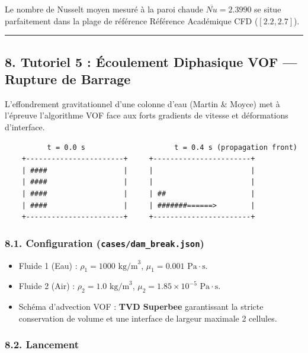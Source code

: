 \documentclass[
  french,
]{article}
\providecommand{\tightlist}{%
  \setlength{\itemsep}{0pt}\setlength{\parskip}{0pt}}
\begin{document}
Le nombre de Nusselt moyen mesuré à la paroi chaude
\(\overline{Nu} = 2.3990\) se situe parfaitement dans la plage de
référence Référence Académique CFD (\([2.2, 2.7]\)).

\begin{center}\rule{0.5\linewidth}{0.5pt}\end{center}

\subsection{8. Tutoriel 5 : Écoulement Diphasique VOF --- Rupture de
Barrage}\label{tutoriel-5-uxe9coulement-diphasique-vof-rupture-de-barrage}

L'effondrement gravitationnel d'une colonne d'eau (Martin \& Moyce) met
à l'épreuve l'algorithme VOF face aux forts gradients de vitesse et
déformations d'interface.

\begin{verbatim}
          t = 0.0 s                     t = 0.4 s (propagation front)
    +-----------------------+     +-----------------------+
    | ####                  |     |                       |
    | ####                  |     |                       |
    | ####                  |     | ##                    |
    | ####                  |     | #######======>        |
    +-----------------------+     +-----------------------+
\end{verbatim}

\subsubsection{\texorpdfstring{8.1. Configuration
(\texttt{cases/dam\_break.json})}{8.1. Configuration (cases/dam\_break.json)}}\label{configuration-casesdam_break.json}

\begin{itemize}
\tightlist
\item
  Fluide 1 (Eau) : \(\rho_1 = 1000\text{ kg/m}^3\),
  \(\mu_1 = 0.001\text{ Pa}\cdot\text{s}\).
\item
  Fluide 2 (Air) : \(\rho_2 = 1.0\text{ kg/m}^3\),
  \(\mu_2 = 1.85 \times 10^{-5}\text{ Pa}\cdot\text{s}\).
\item
  Schéma d'advection VOF : \textbf{TVD Superbee} garantissant la stricte
  conservation de volume et une interface de largeur maximale 2
  cellules.
\end{itemize}

\subsubsection{8.2. Lancement}\label{lancement-2}
\end{document}
